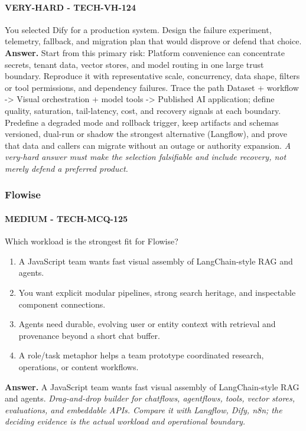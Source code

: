 \paragraph{VERY-HARD - TECH-VH-124} You selected Dify for a production system. Design the failure experiment, telemetry, fallback, and migration plan that would disprove or defend that choice.
\textbf{Answer.} Start from this primary risk: Platform convenience can concentrate secrets, tenant data, vector stores, and model routing in one large trust boundary. Reproduce it with representative scale, concurrency, data shape, filters or tool permissions, and dependency failures. Trace the path Dataset + workflow -> Visual orchestration + model tools -> Published AI application; define quality, saturation, tail-latency, cost, and recovery signals at each boundary. Predefine a degraded mode and rollback trigger, keep artifacts and schemas versioned, dual-run or shadow the strongest alternative (Langflow), and prove that data and callers can migrate without an outage or authority expansion.
\textit{A very-hard answer must make the selection falsifiable and include recovery, not merely defend a preferred product.}
\subsubsection*{Flowise}
\paragraph{MEDIUM - TECH-MCQ-125} Which workload is the strongest fit for Flowise?
\begin{enumerate}[label=\Alph*.]
\item A JavaScript team wants fast visual assembly of LangChain-style RAG and agents.
\item You want explicit modular pipelines, strong search heritage, and inspectable component connections.
\item Agents need durable, evolving user or entity context with retrieval and provenance beyond a short chat buffer.
\item A role/task metaphor helps a team prototype coordinated research, operations, or content workflows.
\end{enumerate}
\textbf{Answer.} A JavaScript team wants fast visual assembly of LangChain-style RAG and agents.
\textit{Drag-and-drop builder for chatflows, agentflows, tools, vector stores, evaluations, and embeddable APIs. Compare it with Langflow, Dify, n8n; the deciding evidence is the actual workload and operational boundary.}
